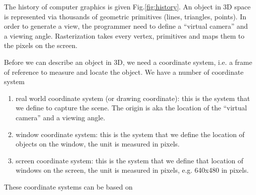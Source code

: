 The history of computer graphics is given Fig.\ref{fig:history}.
An object in 3D space is represented via thousands of geometric
primitives (lines, triangles, points). In order to generate a view,
the programmer need to define a ``virtual camera'' and a viewing
angle.  Rasterization takes every vertex, primitives and maps them to
the pixels on the screen.

Before we can describe an object in 3D, we need a coordinate system,
i.e. a frame of reference to measure and locate the object. We have a
number of coordinate system
\begin{enumerate}
\item real world coordinate system (or drawing coordinate): this is
  the system that we define to capture the scene.  The origin is aka
  the location of the ``virtual camera'' and a viewing angle.

\item window coordinate system: this is the system that we define the
  location of objects on the window, the unit is measured in pixels.

\item screen coordinate system: this is the system that we define that
  location of windows on the screen, the unit is measured in pixels,
  e.g. 640x480 in pixels.
\end{enumerate}
These coordinate systems can be based on 
